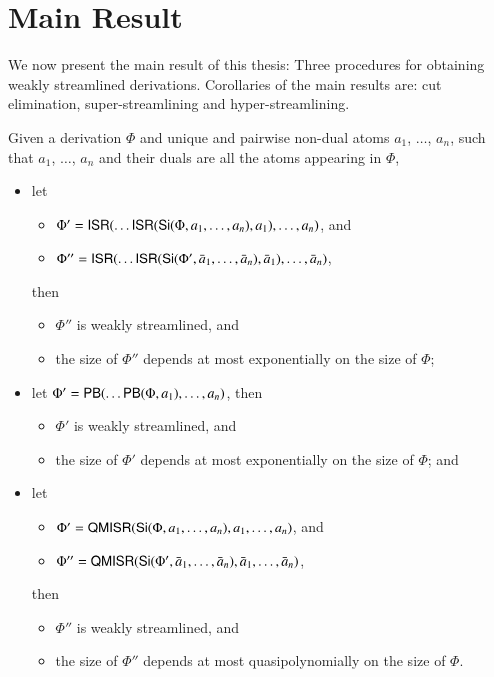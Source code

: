 \chapter{Main Result}\label{chapter:MainResult}

We now present the main result of this thesis: Three procedures for obtaining weakly streamlined derivations. Corollaries of the main results are: cut elimination, super-streamlining and hyper-streamlining.

\begin{theorem}\label{theorem:WeakStreamlining}
Given a derivation $\Phi$ and unique and pairwise non-dual atoms $a_1$, $\dots$, $a_n$, such that $a_1$, $\dots$, $a_n$ and their duals are all the atoms appearing in $\Phi$,
\begin{itemize}
\item let
\begin{itemize}
\item $\Phi'=\mathsf{ISR}(\dots\mathsf{ISR}(\mathsf{Si}(\Phi,a_1,\dots,a_n),a_1),\dots,a_n)$, and
\item $\Phi''=\mathsf{ISR}(\dots\mathsf{ISR}(\mathsf{Si}(\Phi',\bar a_1,\dots,\bar a_n),\bar a_1),\dots,\bar a_n)$,
\end{itemize}
then
\begin{itemize}
\item $\Phi''$ is weakly streamlined, and
\item the size of $\Phi''$ depends at most exponentially on the size of\/ $\Phi$;
\end{itemize}
\item let\/ $\Phi'=\mathsf{PB}(\dots\mathsf{PB}(\Phi,a_1),\dots,a_n)$, then
\begin{itemize}
\item $\Phi'$ is weakly streamlined, and
\item the size of\/ $\Phi'$ depends at most exponentially on the size of\/ $\Phi$; and
\end{itemize}
\item let
\begin{itemize}
\item $\Phi'=\mathsf{QMISR}(\mathsf{Si}(\Phi,a_1,\dots,a_n),a_1,\dots,a_n)$, and
\item $\Phi''=\mathsf{QMISR}(\mathsf{Si}(\Phi',\bar a_1,\dots,\bar a_n),\bar a_1,\dots,\bar a_n)$,
\end{itemize}
then
\begin{itemize}
\item $\Phi''$ is weakly streamlined, and
\item the size of\/ $\Phi''$ depends at most quasipolynomially on the size of\/ $\Phi$.
\end{itemize}
\end{itemize}
\end{theorem}

